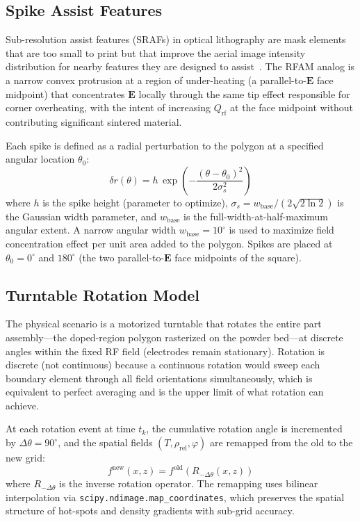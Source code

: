 \documentclass[10pt,twocolumn]{article}
\newcommand{\Qrf}{Q_{\mathrm{rf}}}
\newcommand{\rhorel}{\rho_{\mathrm{rel}}}
\newcommand{\phimelt}{\varphi}
\newcommand{\vect}[1]{\boldsymbol{#1}}
\begin{document}
\subsection{Spike Assist Features}
\label{sec:spike_method}

Sub-resolution assist features (SRAFs) in optical lithography are mask
elements that are too small to print but that improve the aerial image
intensity distribution for nearby features they are designed to
assist~\cite{Liebmann2001sraf}.  The RFAM analog is a narrow convex
protrusion at a region of under-heating (a parallel-to-$\vect{E}$ face
midpoint) that concentrates $\vect{E}$ locally through the same tip
effect responsible for corner overheating, with the intent of
increasing $\Qrf$ at the face midpoint without contributing significant
sintered material.

Each spike is defined as a radial perturbation to the polygon at a
specified angular location $\theta_0$:
\begin{equation}
  \delta r(\theta) = h\,\exp\!\!\left(-\frac{(\theta-\theta_0)^2}{2\sigma_s^2}\right)
  \label{eq:spike_profile}
\end{equation}
where $h$ is the spike height (parameter to optimize),
$\sigma_s = w_{\mathrm{base}} / (2\sqrt{2\ln 2})$ is the Gaussian
width parameter, and $w_{\mathrm{base}}$ is the full-width-at-half-maximum
angular extent.  A narrow angular width $w_{\mathrm{base}} = 10^\circ$
is used to maximize field concentration effect per unit area added to
the polygon.  Spikes are placed at $\theta_0 = 0^\circ$ and
$180^\circ$ (the two parallel-to-$\vect{E}$ face midpoints of the
square).

\subsection{Turntable Rotation Model}
\label{sec:turntable_method}

The physical scenario is a motorized turntable that rotates the entire
part assembly---the doped-region polygon rasterized on the powder
bed---at discrete angles within the fixed RF field (electrodes remain
stationary).  Rotation is discrete (not continuous) because a
continuous rotation would sweep each boundary element through all
field orientations simultaneously, which is equivalent to perfect
averaging and is the upper limit of what rotation can achieve.

At each rotation event at time $t_k$, the cumulative rotation angle
is incremented by $\Delta\theta = 90^\circ$, and the spatial fields
$(T, \rhorel, \phimelt)$ are remapped from the old to the new grid:
\begin{equation}
  f^{\mathrm{new}}(x, z) = f^{\mathrm{old}}(R_{-\Delta\theta}(x,z))
  \label{eq:rotation_remap}
\end{equation}
where $R_{-\Delta\theta}$ is the inverse rotation operator.  The
remapping uses bilinear interpolation via
\texttt{scipy.ndimage.map\_coordinates}, which preserves the spatial
structure of hot-spots and density gradients with sub-grid accuracy.
\end{document}
